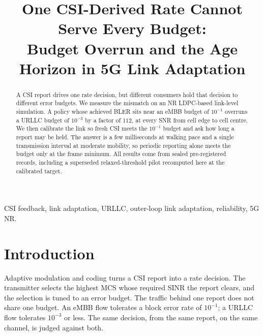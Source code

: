 \documentclass[conference]{IEEEtran}
\begin{document}
\title{One CSI-Derived Rate Cannot Serve Every Budget:\\
Budget Overrun and the Age Horizon in 5G Link Adaptation}

\author{
}

\maketitle
\thispagestyle{empty}
\pagestyle{empty}         %

\begin{abstract}
A CSI report drives one rate decision, but different consumers hold that
decision to different error budgets. We measure the mismatch on an NR
LDPC-based link-level simulation. A policy whose achieved BLER sits near an
eMBB budget of $10^{-1}$ overruns a URLLC budget of $10^{-3}$ by a factor of
$112$, at every SNR from cell edge to cell centre. We then calibrate the link
so fresh CSI meets the $10^{-1}$ budget and ask how long a report may be held.
The answer is a few milliseconds at walking pace and a single transmission
interval at moderate mobility, so periodic reporting alone meets the budget
only at the frame minimum. All results come from sealed pre-registered records,
including a superseded relaxed-threshold pilot recomputed here at the
calibrated target.
\end{abstract}

\begin{IEEEkeywords}
CSI feedback, link adaptation, URLLC, outer-loop link adaptation, reliability, 5G NR.
\end{IEEEkeywords}

\section{Introduction}
Adaptive modulation and coding turns a CSI report into a rate decision. The
transmitter selects the highest MCS whose required SINR the report clears, and
the selection is tuned to an error budget. The traffic behind one report does
not share one budget. An eMBB flow tolerates a block error rate of $10^{-1}$; a
URLLC flow tolerates $10^{-3}$ or less. The same decision, from the same report,
on the same channel, is judged against both.
\end{document}
